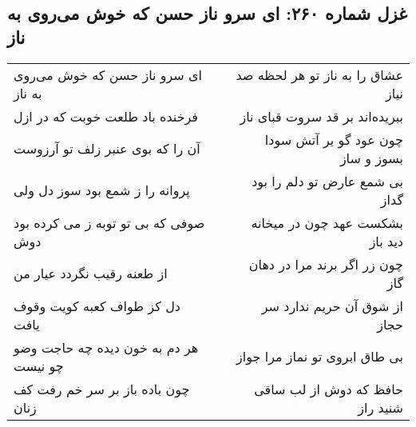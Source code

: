 \begin{center}
\section*{غزل شماره ۲۶۰: ای سرو ناز حسن که خوش می‌روی به ناز}
\label{sec:sh260}
\begin{longtable}{l p{0.5cm} r}
ای سرو ناز حسن که خوش می‌روی به ناز
&&
عشاق را به ناز تو هر لحظه صد نیاز
\\
فرخنده باد طلعت خوبت که در ازل
&&
ببریده‌اند بر قد سروت قبای ناز
\\
آن را که بوی عنبر زلف تو آرزوست
&&
چون عود گو بر آتش سودا بسوز و ساز
\\
پروانه را ز شمع بود سوز دل ولی
&&
بی شمع عارض تو دلم را بود گداز
\\
صوفی که بی تو توبه ز می کرده بود دوش
&&
بشکست عهد چون در میخانه دید باز
\\
از طعنه رقیب نگردد عیار من
&&
چون زر اگر برند مرا در دهان گاز
\\
دل کز طواف کعبه کویت وقوف یافت
&&
از شوق آن حریم ندارد سر حجاز
\\
هر دم به خون دیده چه حاجت وضو چو نیست
&&
بی طاق ابروی تو نماز مرا جواز
\\
چون باده باز بر سر خم رفت کف زنان
&&
حافظ که دوش از لب ساقی شنید راز
\\
\end{longtable}
\end{center}
